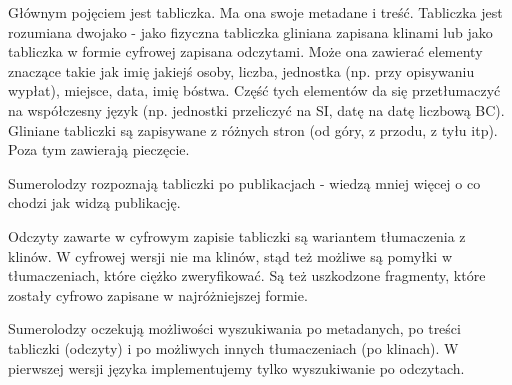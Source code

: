 Głównym pojęciem jest tabliczka. Ma ona swoje metadane i treść. Tabliczka jest rozumiana dwojako - jako fizyczna tabliczka gliniana
zapisana klinami lub jako tabliczka w formie cyfrowej zapisana odczytami. Może ona zawierać elementy znaczące takie jak imię jakiejś 
osoby, liczba, jednostka (np. przy opisywaniu wypłat), miejsce, data, imię bóstwa. Część tych elementów da się przetłumaczyć na 
współczesny język (np. jednostki przeliczyć na SI, datę na datę liczbową BC). Gliniane tabliczki są zapisywane z różnych stron 
(od góry, z przodu, z tyłu itp). Poza tym zawierają pieczęcie. 

Sumerolodzy rozpoznają tabliczki po publikacjach - wiedzą mniej więcej o co chodzi jak widzą publikację.

Odczyty zawarte w cyfrowym zapisie tabliczki są wariantem tłumaczenia z klinów. W cyfrowej wersji nie ma klinów, stąd też możliwe
są pomyłki w tłumaczeniach, które ciężko zweryfikować. Są też uszkodzone fragmenty, które zostały cyfrowo zapisane w najróżniejszej
formie.

Sumerolodzy oczekują możliwości wyszukiwania po metadanych, po treści tabliczki (odczyty) i po możliwych innych tłumaczeniach (po klinach).
W pierwszej wersji języka implementujemy tylko wyszukiwanie po odczytach.